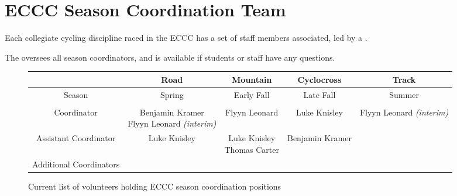 \section{ECCC Season Coordination Team}
\label{role:eccc_coordination_team}

Each collegiate cycling discipline raced in the ECCC has a set of staff members associated, led by
a .

The  oversees all season coordinators, and is available if students or staff have any questions.

\begin{figure}[h]
  \caption{Current list of volunteers holding ECCC season coordination positions}
  \begin{tabular}{c | c | c | c | c}
    \toprule
    &
    Road &
    Mountain &
    Cyclocross & Track
    \\
    \midrule
    Season &
    Spring &
    Early Fall &
    Late Fall &
    Summer \\
    \midrule \\
    Coordinator &
    \makecell{Benjamin Kramer \\ Flyyn Leonard \textit{(interim)}} &
    Flyyn Leonard
    & Luke Knisley
    & Flyyn Leonard \textit{(interim)} \\
    Assistant Coordinator &
    Luke Knisley &
    \makecell{Luke Knisley \\ Thomas Carter} &
    Benjamin Kramer & \\
    Additional Coordinators & & & &
    \bottomrule
  \end{tabular}
\end{figure}



